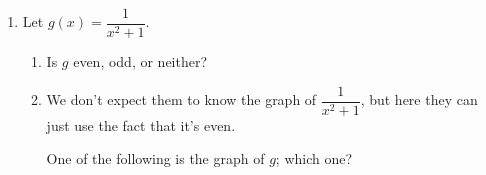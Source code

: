 \documentclass{article}
\begin{document}
\begin{enumerate}
\begin{enumerate}
\begin{enumerate}
    \item
      \begin{problem}[\vfill]
        $\displaystyle \lim_{h\rightarrow 0}\frac{P(2+h) - P(2)}{h}$
      \end{problem}

    \end{enumerate}

  \item
    \begin{problem}[\nstretch{2}]
      If you had a graph of $P(t)$, how would you visualize the 3 quantities in \ref{workshop-interpret-and-visualize-derivative-interpret} on that graph?  
    \end{problem}

  \end{enumerate}

\item 
  Let $g(x) = \dfrac{1}{x^2 + 1}$.
  \begin{enumerate}
  \item
    \begin{problem}[0.5in]
      Is $g$ even, odd, or neither? 
    \end{problem}

  \item

    \begin{workshop}
      We don't expect them to know the graph of $\dfrac{1}{x^2 + 1}$, but here they can just use the fact that it's even.
    \end{workshop}

    \begin{problem}
      One of the following is the graph of $g$; which one?

      \begin{center}
        \qquad
        \qquad
      \end{center}
    \end{problem}


\end{enumerate}
\end{enumerate}
\end{document}
